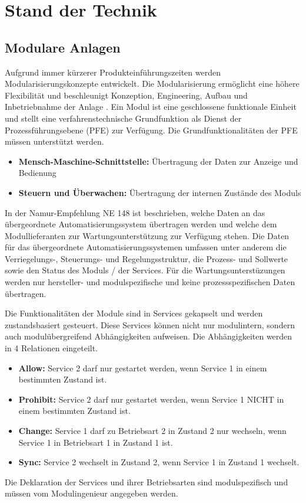 
\chapter{Stand der Technik}
\label{sec:StandDerTechnik}


\section{Modulare Anlagen}

Aufgrund immer kürzerer Produkteinführungszeiten werden Modularisierungskonzepte entwickelt. Die Modularisierung ermöglicht eine höhere Flexibilität und beschleunigt Konzeption, Engineering, Aufbau und Inbetriebnahme der Anlage \cite{Urbas2012}. Ein Modul ist eine geschlossene funktionale Einheit und stellt eine verfahrenstechnische Grundfunktion als Dienst der Prozessführungsebene (PFE) zur Verfügung. Die Grundfunktionalitäten der PFE müssen unterstützt werden. \cite{Bernshausen2016}
\begin{itemize}
\item \textbf{Mensch-Maschine-Schnittstelle:} Übertragung der Daten zur Anzeige und Bedienung
\item \textbf{Steuern und Überwachen:} Übertragung der internen Zustände des Moduls
\end{itemize}

In der Namur-Empfehlung NE 148 \cite{NAMURArbeitskreis1.122013} ist beschrieben, welche Daten an das übergeordnete Automatisierungssystem übertragen werden und welche dem Modullieferanten zur Wartungsunterstützung zur Verfügung stehen. Die Daten für das übergeordnete Automatisierungssystemen umfassen unter anderem die Verriegelungs-, Steuerungs- und Regelungsstruktur, die Prozess- und Sollwerte sowie den Status des Moduls / der Services. Für die Wartungsunterstüzungen werden nur hersteller- und modulspezifische und keine prozessspezifischen Daten übertragen.

Die Funktionalitäten der Module sind in Services gekapselt und werden zustandsbasiert gesteuert. Diese Services können nicht nur modulintern, sondern auch modulübergreifend Abhängigkeiten aufweisen. Die Abhängigkeiten werden in 4 Relationen eingeteilt.
\begin{itemize}
\item \textbf{Allow:} Service 2 darf nur gestartet werden, wenn Service 1 in einem bestimmten Zustand ist.
\item \textbf{Prohibit:} Service 2 darf nur gestartet werden, wenn Service 1 NICHT in einem bestimmten Zustand ist.
\item \textbf{Change:} Service 1 darf zu Betriebsart 2 in Zustand 2 nur wechseln, wenn Service 1 in Betriebsart 1 in Zustand 1 ist.
\item \textbf{Sync:} Service 2 wechselt in Zustand 2, wenn Service 1 in Zustand 1 wechselt.
\end{itemize} 
Die Deklaration der Services und ihrer Betriebsarten sind modulspezifisch und müssen vom Modulingenieur angegeben werden. \cite{Ladiges2018}

